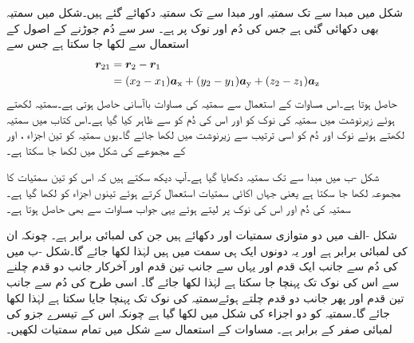 شکل  میں  مبدا سے  تک سمتیہ  اور  مبدا سے  تک سمتیہ  دکھائے گئے ہیں۔شکل میں سمتیہ  بھی دکھائی گئی ہے جس کی دُم   اور  نوک  پر ہے۔ سر سے دُم جوڑنے کے اصول کے استعمال سے  لکھا جا سکتا ہے جس سے 
\begin{gather}
\begin{aligned}\label{مساوات_سمتیہ_کارتیسی_نظام_میں_قیمت}
{\ensuremath{{\boldsymbol{r}}}}_{21}&={{\boldsymbol{r}}}_2-{{\boldsymbol{r}}}_1\\
&=(x_2-x_1) {\boldsymbol{a}}_{\textup{x}}+(y_2-y_1){\boldsymbol{a}}_{\textup{y}}+(z_2-z_1){\boldsymbol{a}}_{\textup{z}}
\end{aligned}
\end{gather}
حاصل ہوتا ہے۔اس مساوات کے استعمال سے سمتیہ کی مساوات باآسانی حاصل ہوتی ہے۔سمتیہ  لکھتے ہوئے زیرنوشت میں سمتیہ کی نوک کو  اور اس کی دُم  کو  سے ظاہر کیا گیا ہے۔اس کتاب میں سمتیہ لکھتے ہوئے نوک اور دُم  کو اسی ترتیب سے زیرنوشت میں لکھا جائے گا۔یوں سمتیہ  کو تین اجزاء ،  اور  کے  مجموعے کی شکل میں لکھا جا سکتا ہے۔

شکل -ب میں مبدا سے  تک سمتیہ دکھایا گیا ہے۔آپ دیکھ سکتے ہیں کہ اس کو تین سمتیات کا مجموعہ لکھا جا سکتا ہے یعنی  جہاں اکائی سمتیات استعمال کرتے ہوئے تینوں اجزاء کو لکھا گیا ہے۔ سمتیہ کی دُم  اور اس کی نوک  پر لیتے ہوئے  یہی جواب  مساوات  سے بھی حاصل ہوتا ہے۔

شکل -الف میں دو متوازی سمتیات  اور  دکھائے ہیں جن کی لمبائی برابر ہے۔ چونکہ ان کی لمبائی برابر ہے اور یہ دونوں ایک ہی سمت میں ہیں لہٰذا  لکھا جائے گا۔شکل -ب میں  کی دُم سے  جانب ایک قدم اور یہاں سے  جانب تین قدم اور آخرکار  جانب دو قدم چلنے سے اس کی نوک تک پہنچا جا سکتا ہے لہٰذا  لکھا جائے گا۔ اسی طرح  کی دُم سے   جانب تین قدم اور پھر  جانب دو قدم چلتے ہوئےسمتیہ کی نوک تک پہنچا جایا سکتا ہے لہٰذا  لکھا جائے گا۔سمتیہ  کو دو اجزاء کی شکل میں لکھا گیا ہے چونکہ اس کے تیسرے جزو کی لمبائی صفر کے برابر ہے۔
مساوات  کے استعمال سے شکل  میں تمام سمتیات لکھیں۔

